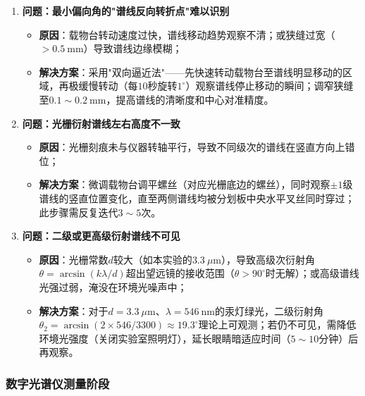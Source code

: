 \documentclass[11pt]{article}
\begin{document}
\begin{enumerate}
    \item \textbf{问题：最小偏向角的"谱线反向转折点"难以识别}
    \begin{itemize}
        \item \textbf{原因}：载物台转动速度过快，谱线移动趋势观察不清；或狭缝过宽（$> 0.5\ \text{mm}$）导致谱线边缘模糊；
        \item \textbf{解决方案}：采用"双向逼近法"——先快速转动载物台至谱线明显移动的区域，再极缓慢转动（每$10$秒旋转$1^\circ$）观察谱线停止移动的瞬间；调窄狭缝至$0.1 \sim 0.2\ \text{mm}$，提高谱线的清晰度和中心对准精度。
    \end{itemize}
    
    \item \textbf{问题：光栅衍射谱线左右高度不一致}
    \begin{itemize}
        \item \textbf{原因}：光栅刻痕未与仪器转轴平行，导致不同级次的谱线在竖直方向上错位；
        \item \textbf{解决方案}：微调载物台调平螺丝（对应光栅底边的螺丝），同时观察$\pm 1$级谱线的竖直位置变化，直至两侧谱线均被分划板中央水平叉丝同时穿过；此步骤需反复迭代$3 \sim 5$次。
    \end{itemize}
    
    \item \textbf{问题：二级或更高级衍射谱线不可见}
    \begin{itemize}
        \item \textbf{原因}：光栅常数$d$较大（如本实验的$3.3\ \mu\text{m}$），导致高级次衍射角$\theta = \arcsin(k\lambda / d)$超出望远镜的接收范围（$\theta > 90^\circ$时无解）；或高级谱线光强过弱，淹没在环境光噪声中；
        \item \textbf{解决方案}：对于$d = 3.3\ \mu\text{m}$、$\lambda = 546\ \text{nm}$的汞灯绿光，二级衍射角$\theta_2 = \arcsin(2 \times 546 / 3300) \approx 19.3^\circ$理论上可观测；若仍不可见，需降低环境光强度（关闭实验室照明灯），延长眼睛暗适应时间（$5 \sim 10$分钟）后再观察。
    \end{itemize}
\end{enumerate}

\subsubsection{数字光谱仪测量阶段}
\end{document}
